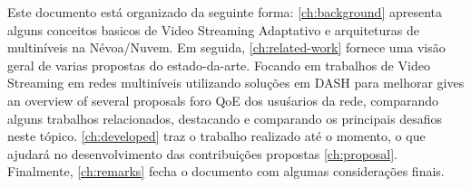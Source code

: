 Este documento está organizado da seguinte forma: \autoref{ch:background} apresenta
alguns conceitos basicos de Video Streaming Adaptativo e arquiteturas de multiníveis na Névoa/Nuvem. Em seguida, \autoref{ch:related-work} fornece uma visão geral de varias propostas 
do estado-da-arte. Focando em trabalhos de Video Streaming em redes multiníveis utilizando soluções em DASH para melhorar gives an overview of several proposals foro QoE dos usuśarios da rede, comparando alguns trabalhos relacionados, destacando e comparando os principais desafios neste tópico. \autoref{ch:developed} traz o trabalho realizado até o momento, o que ajudará no desenvolvimento das contribuições propostas \autoref{ch:proposal}. Finalmente, \autoref{ch:remarks} fecha o documento com algumas considerações finais.
 

